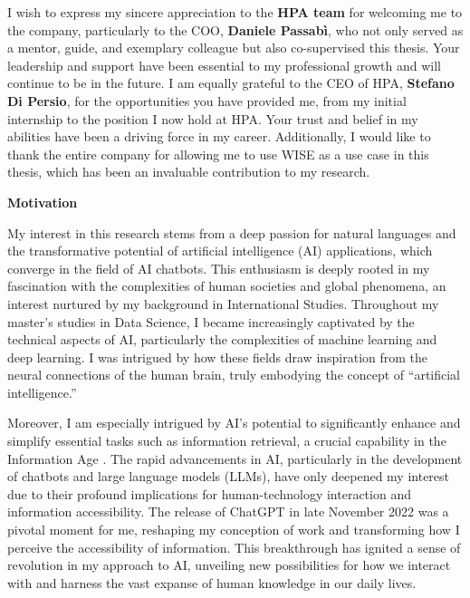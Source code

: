 I wish to express my sincere appreciation to the \textbf{HPA team} for welcoming me to the company, particularly to the COO, \textbf{Daniele Passabì}, who not only served as a mentor, guide, and exemplary colleague but also co-supervised this thesis. Your leadership and support have been essential to my professional growth and will continue to be in the future. I am equally grateful to the CEO of HPA, \textbf{Stefano Di Persio}, for the opportunities you have provided me, from my initial internship to the position I now hold at HPA. Your trust and belief in my abilities have been a driving force in my career. Additionally, I would like to thank the entire company for allowing me to use WISE as a use case in this thesis, which has been an invaluable contribution to my research.

\newpage

\begin{center}
    \normalsize\textbf{Motivation}
\end{center}

My interest in this research stems from a deep passion for natural languages and the transformative potential of artificial intelligence (AI) applications, which converge in the field of AI chatbots. This enthusiasm is deeply rooted in my fascination with the complexities of human societies and global phenomena, an interest nurtured by my background in International Studies. Throughout my master’s studies in Data Science, I became increasingly captivated by the technical aspects of AI, particularly the complexities of machine learning and deep learning. I was intrigued by how these fields draw inspiration from the neural connections of the human brain, truly embodying the concept of “artificial intelligence.”

Moreover, I am especially intrigued by AI’s potential to significantly enhance and simplify essential tasks such as information retrieval, a crucial capability in the Information Age \cite{wikipedia_information_age}. The rapid advancements in AI, particularly in the development of chatbots and large language models (LLMs), have only deepened my interest due to their profound implications for human-technology interaction and information accessibility. The release of ChatGPT in late November 2022 was a pivotal moment for me, reshaping my conception of work and transforming how I perceive the accessibility of information. This breakthrough has ignited a sense of revolution in my approach to AI, unveiling new possibilities for how we interact with and harness the vast expanse of human knowledge in our daily lives.

